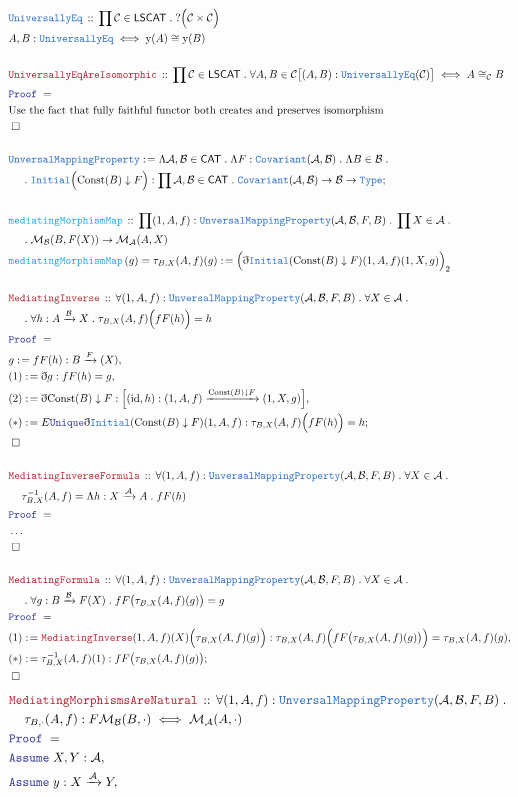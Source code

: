 \documentclass[12pt]{scrartcl}
\newcommand{\TYPE}[1]{\textcolor{NavyBlue}{\mathtt{#1}}}
\newcommand{\FUNC}[1]{\textcolor{Cerulean}{\mathtt{#1}}}
\newcommand{\LOGIC}[1]{\textcolor{Blue}{\mathtt{#1}}}
\newcommand{\THM}[1]{\textcolor{Maroon}{\mathtt{#1}}}
\renewcommand{\.}{\; . \;}
\newcommand{\de}{: \kern 0.1pc =}
\newcommand{\Act}[1]{\left( #1 \right)}
\newcommand{\Theorem}[2]{& \THM{#1} \, :: \, #2 \\ & \Proof = \\ }
\newcommand{\DeclareType}[2]{& \TYPE{#1} \, :: \, #2 \\}
\newcommand{\DefineType}[3]{& #1 : \TYPE{#2} \iff #3 \\}
\newcommand{\DeclareFunc}[2]{& \FUNC{#1} \, :: \, #2 \\}
\newcommand{\DefineNamedFunc}[4]{&  \FUNC{#1}\Act{#2} = #3 \de #4 \\}
\newcommand{\NewLine}{\\ & \kern 1pc}
\newcommand{\Page}[1]{ \begin{align*} #1 \end{align*}   }
\newcommand{ \bd }{ \ByDef }
\newcommand{\NoProof}{ & \ldots \\ \EndProof}
\newcommand{\Type}{\TYPE{Type}}
\DeclareMathOperator*{\id}{id}
\newcommand{\Mor}{\mathcal{M}}
\newcommand{\Arrow}{\xrightarrow}
\newcommand{\Say}[3]{& #1 \de #2 : #3, \\}
\newcommand{\Conclude}[3]{& #1 \de #2 : #3; \\}
\newcommand{\Assume}[2]{& \LOGIC{Assume} \; #1 : #2, \\}
\newcommand{\QED}{\; \square}
\newcommand{\EndProof}{& \QED \\}
\newcommand{\ByDef}{\eth}
\newcommand{\Proof}{\LOGIC{Proof} \; }
\newcommand{\Cov}{\TYPE{Covariant}}
\newcommand{\UMP}{\TYPE{UnversalMappingProperty}}
\newcommand{\C}{\mathcal{C}}
\newcommand{\A}{\mathcal{A}}
\newcommand{\B}{\mathcal{B}}
\newcommand{\CAT}{\mathsf{CAT}}
\begin{document}
\Page{
	\DeclareType{UniversallyEq}{\prod \C \in \mathsf{LSCAT} \. ?\Big( \C \times \C \Big)  }
	\DefineType{A,B}{UniversallyEq}{ \mathrm{y}(A) \cong \mathrm{y}(B)  }
	\\
	\Theorem{UniversallyEqAreIsomorphic}{\prod \C \in \mathsf{LSCAT} \. \forall A,B \in \C 
		\big[(A,B) : \TYPE{UniversallyEq}(\C)\big] \iff A \cong_\C B  }
	& \text{Use the fact that fully faithful functor both creates and preserves isomorphism} \\
	\EndProof
	\\
	\Conclude{\UMP}{\Lambda \A,\B \in \CAT \. \Lambda F : \Cov(\A,\B) \. \Lambda B \in \B \. \NewLine \. 
		\TYPE{Initial}\Big( \mathrm{Const}(B) \downarrow F \Big)    } 
	{ \prod \A,\B \in \CAT \. \Cov(\A,\B) \to \B \to \Type }
	\\
	\DeclareFunc{mediatingMorphismMap}{ \prod (1,A,f) : \UMP(\A,\B, F, B ) \. \prod X \in  \A \. \NewLine 
		 \. \Mor_\B(B, F(X)) \to \Mor_\A(A,X)   }
	\DefineNamedFunc{mediatingMorphismMap}{g}{\tau_{B,X}(A,f)(g)}
	{ \Big(\bd \TYPE{Initial}(\mathrm{Const}(B) \downarrow F)(1,A,f)(1,X,g) \Big)_2    }
	\\
	\Theorem{MediatingInverse}
	{ 
		\forall (1,A,f) : \UMP(\A,\B,F,B) \. \forall X \in \A \. \NewLine \. 
		\forall h : A \Arrow{\B} X  \.  \tau_{B,X}(A,f) \Big( f F(h) \Big) = h
	}
	\Say{g}{f F(h)}{B \Arrow F(X)}
	\Say{(1) }{\bd g }{f F(h) = g}
	\Say{(2)}{\bd \mathrm{Const}(B) \downarrow F}{\Big[(\id,h) : (1,A,f) \Arrow{\mathrm{Const}(B) \downarrow F} (1,X,g)\Big]}
	\Conclude{(*)}{E\LOGIC{Unique}\bd \TYPE{Initial}(\mathrm{Const}(B) \downarrow F)(1,A,f)}
	{ \tau_{B,X}(A,f)\Big( f F(h) \Big) = h }
	\EndProof
	\\
	\Theorem{MediatingInverseFormula}{ \forall (1,A,f) : \UMP(\A,\B,F,B) \. \forall X \in \A \. \NewLine 
		\tau_{B,X}^{-1}(A,f) = \Lambda h : X \Arrow{\A} A \.  fF(h) }
	\NoProof
	\\
	\Theorem{MediatingFormula}{\forall (1,A,f) : \UMP(\A,\B,F,B) \. \forall X \in \A \. \NewLine \.
	 \forall g : B \Arrow{\B} F(X) \. f F\big( \tau_{B,X}(A,f)(g) \big) = g
	}
	\Say{(1)}{\THM{MediatingInverse}(1,A,f)(X)\Big( \tau_{B,X}(A,f)(g)  \Big)}
	{  \tau_{B,X}(A,f) \Big( f F\big( \tau_{B,X}(A,f)(g) \big) \Big) =  \tau_{B,X}(A,f)(g)         }
	\Conclude{(*)}{\tau^{-1}_{B,X}(A,f)(1)}{ f F\big( \tau_{B,X}(A,f)(g) \big) 
	}
	\EndProof
} \Page{
	\Theorem{MediatingMorphismsAreNatural}
	{  \forall  (1,A,f) : \UMP(\A,\B,F,B)  \. 
		\NewLine 
		\tau_{B,\cdot}(A,f) : F\Mor_\B(B,\cdot) \iff \Mor_\A(A,\cdot)  
	}
	\Assume{X,Y}{\A}
	\Assume{y}{ X \Arrow{\A} Y  }
}
\end{document}
